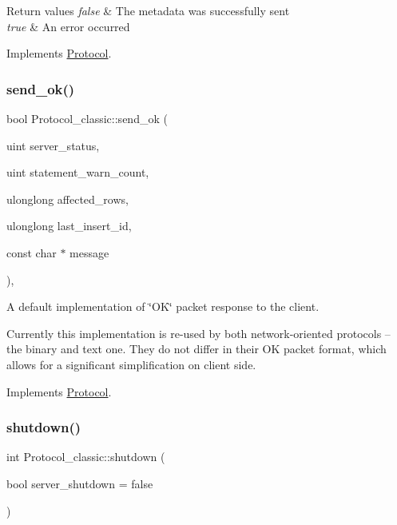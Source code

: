 \begin{DoxyRetVals}{Return values}
{\em false} & The metadata was successfully sent \\
\hline
{\em true} & An error occurred \\
\hline
\end{DoxyRetVals}


Implements \mbox{\hyperlink{classProtocol_ab1c4f70c198fa10fbf4aed0dfc2c4847}{Protocol}}.

\mbox{\label{classProtocol__classic_a482f606dfaeea989625fd9d837769f32}} 
\subsubsection{\texorpdfstring{send\+\_\+ok()}{send\_ok()}}
{\footnotesize\ttfamily bool Protocol\+\_\+classic\+::send\+\_\+ok (\begin{DoxyParamCaption}\item[{uint}]{server\+\_\+status,  }\item[{uint}]{statement\+\_\+warn\+\_\+count,  }\item[{ulonglong}]{affected\+\_\+rows,  }\item[{ulonglong}]{last\+\_\+insert\+\_\+id,  }\item[{const char $\ast$}]{message }\end{DoxyParamCaption})\hspace{0.3cm}{\ttfamily [protected]}, {\ttfamily [virtual]}}

A default implementation of \char`\"{}\+O\+K\char`\"{} packet response to the client.

Currently this implementation is re-\/used by both network-\/oriented protocols -- the binary and text one. They do not differ in their OK packet format, which allows for a significant simplification on client side. 

Implements \mbox{\hyperlink{classProtocol_a5af2742550f44725128e121eb647eb34}{Protocol}}.

\mbox{\label{classProtocol__classic_aec124efa16faabe9b2afa3ff7510d189}} 
\subsubsection{\texorpdfstring{shutdown()}{shutdown()}}
{\footnotesize\ttfamily int Protocol\+\_\+classic\+::shutdown (\begin{DoxyParamCaption}\item[{bool}]{server\+\_\+shutdown = {\ttfamily false} }\end{DoxyParamCaption})\hspace{0.3cm}{\ttfamily [virtual]}}

